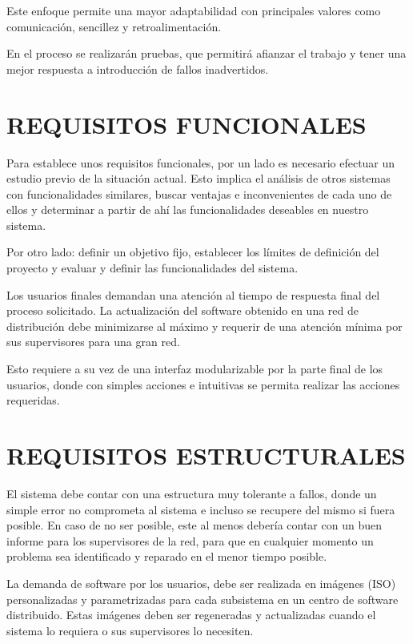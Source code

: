 \newpage
Este enfoque permite una mayor adaptabilidad con principales valores como
comunicación, sencillez y retroalimentación\cite{Bec00}.

En el proceso se realizarán pruebas, que permitirá afianzar el trabajo y tener
una mejor respuesta a introducción de fallos inadvertidos.

\section{\uppercase{Requisitos funcionales}}

Para establece unos requisitos funcionales, por un lado es necesario efectuar un
estudio previo de la situación actual.
Esto implica el análisis de otros sistemas con funcionalidades similares, buscar
ventajas e inconvenientes de cada uno de ellos y determinar a partir de ahí las
funcionalidades deseables en nuestro sistema.

Por otro lado: definir un objetivo fijo, establecer los límites de definición
del proyecto y evaluar y definir las funcionalidades del sistema.

Los usuarios finales demandan una atención al tiempo de respuesta final del
proceso solicitado. La actualización del software obtenido en una red de
distribución debe minimizarse al máximo\cite{Bau10} y requerir de una
atención mínima por sus supervisores para una gran red.

Esto requiere a su vez de una interfaz modularizable por la parte final de los
usuarios, donde con simples acciones e intuitivas se permita realizar las
acciones requeridas.

\section{\uppercase{Requisitos estructurales}}

El sistema debe contar con una estructura muy tolerante a fallos,
donde un simple error no comprometa al sistema e incluso se recupere del mismo
si fuera posible. En caso de no ser posible, este al menos debería contar
con un buen informe para los supervisores de la red, para que en cualquier
momento un problema sea identificado y reparado en el menor tiempo posible.

La demanda de software por los usuarios, debe ser realizada en imágenes
(ISO) personalizadas y parametrizadas para cada subsistema en un centro de
software distribuido. Estas imágenes deben ser regeneradas y actualizadas
cuando el sistema lo requiera o sus supervisores lo necesiten.

